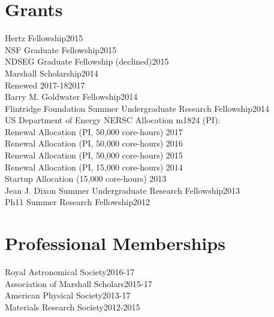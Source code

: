 \documentclass[line, margin]{res3address}
\begin{document}
\begin{resume}
\section{Grants}
Hertz Fellowship\hfill 2015\\
NSF Graduate Fellowship\hfill 2015\\
NDSEG Graduate Fellowship (declined)\hfill 2015\\
Marshall Scholarship\hfill 2014\\
\phantom{4ex} Renewed 2017-18\hfill 2017\\
Barry M. Goldwater Fellowship\hfill 2014\\
Flintridge Foundation Summer Undergraduate Research Fellowship\hfill 2014\\
US Department of Energy NERSC Allocation m1824 (PI):\\
\phantom{4ex} Renewal Allocation (PI, 50,000 core-hours) \hfill 2017\\
\phantom{4ex} Renewal Allocation (PI, 50,000 core-hours) \hfill 2016\\
\phantom{4ex} Renewal Allocation (PI, 50,000 core-hours) \hfill 2015\\
\phantom{4ex} Renewal Allocation (PI, 15,000 core-hours) \hfill 2014\\
\phantom{4ex} Startup Allocation (15,000 core-hours) \hfill 2013\\
Jean J. Dixon Summer Undergraduate Research Fellowship\hfill 2013\\
Ph11 Summer Research Fellowship\hfill 2012\\


\section{Professional Memberships}
Royal Astronomical Society\hfill 2016-17\\
Association of Marshall Scholars\hfill 2015-17\\
American Physical Society\hfill 2013-17\\
Materials Research Society\hfill 2012-2015


\end{resume}
\end{document}
